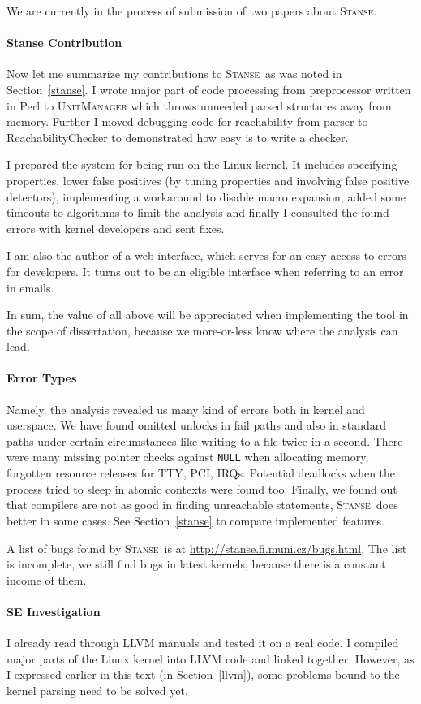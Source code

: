 \documentclass[11pt,a4paper]{article}
\newcommand{\stan}{\textsc{Stanse}}
\begin{document}
We are currently in the process of submission of two papers about \stan.

\paragraph{Stanse Contribution}
Now let me summarize my contributions to \stan\ as was noted in
Section~\ref{stanse}. I wrote major part of code processing from preprocessor
written in Perl to \textsc{UnitManager} which throws unneeded parsed
structures away from memory. Further I moved debugging code for reachability
from parser to ReachabilityChecker to demonstrated how easy is to write a
checker.

I prepared the system for being run on the Linux kernel. It includes
specifying properties, lower false positives (by tuning properties and
involving false positive detectors), implementing a workaround to disable
macro expansion, added some timeouts to algorithms to limit the analysis and
finally I consulted the found errors with kernel developers and sent fixes.

I am also the author of a web interface, which serves for an easy access to
errors for developers. It turns out to be an eligible interface when referring
to an error in emails.

In sum, the value of all above will be appreciated when implementing the tool
in the scope of dissertation, because we more-or-less know where the analysis
can lead.

\paragraph{Error Types} Namely, the analysis revealed us many kind of errors
both in kernel and userspace. We have found omitted unlocks in fail paths and
also in standard paths under certain circumstances like writing to a file
twice in a second. There were many missing pointer checks against
\texttt{NULL} when allocating memory, forgotten resource releases for TTY,
PCI, IRQs. Potential deadlocks when the process tried to sleep in atomic
contexts were found too. Finally, we found out that compilers are not as good
in finding unreachable statements, \stan\ does better in some cases. See
Section~\ref{stanse} to compare implemented features.

A list of bugs found by \stan\ is at \url{http://stanse.fi.muni.cz/bugs.html}.
The list is incomplete, we still find bugs in latest kernels, because there
is a constant income of them.

\paragraph{SE Investigation}
I already read through LLVM manuals and tested it on a real code. I compiled
major parts of the Linux kernel into LLVM code and linked together. However,
as I expressed earlier in this text (in Section~\ref{llvm}), some problems
bound to the kernel parsing need to be solved yet.
\end{document}
